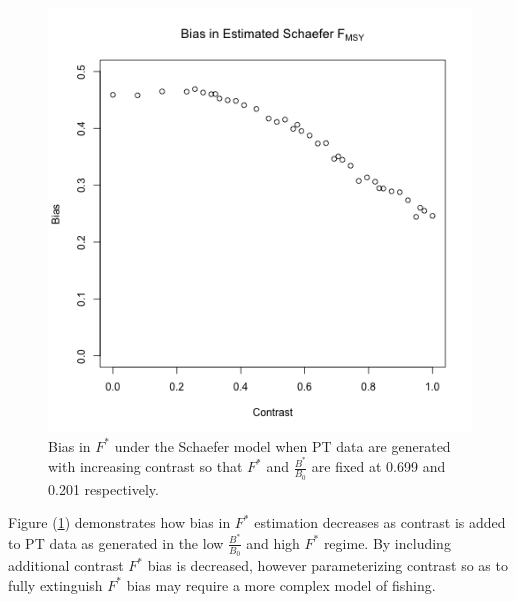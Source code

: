 %
\begin{figure}
\begin{minipage}[h!]{0.49\textwidth}
\includegraphics[width=\textwidth]{../ptNew/contrastTest.png}
\end{minipage}
\begin{minipage}[h!]{0.49\textwidth}
\caption{
Bias in $F^*$ under the Schaefer model when PT data are generated
with increasing contrast so that $F^*$ and $\frac{B^*}{B_0}$ are fixed at
0.699 and 0.201 respectively. %
}\label{conTest}
\end{minipage}
\end{figure}

%
Figure (\ref{conTest}) demonstrates how bias in $F^*$ estimation %
decreases as contrast is added to PT data as generated in the low $\frac{B^*}{B_0}$ and
high $F^*$ regime. By including additional contrast $F^*$ bias is decreased, however
parameterizing contrast so as to fully extinguish $F^*$ bias may require a more complex
model of fishing.

